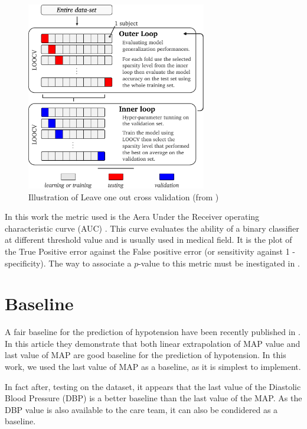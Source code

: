 \documentclass[a4paper,12pt]{article}
\begin{document}
\begin{figure}
    \centering
    \includegraphics[width=0.7\textwidth]{figures/chap_1_NLOO.pdf}
    \caption{Illustration of Leave one out cross validation (from \cite{meghnoudjSparseOptimalControlbased2024})}
    \label{fig:loocv}
\end{figure}

In this work the metric used is the Aera Under the Receiver operating characteristic curve (AUC) \cite{masonAreasRelativeOperating2002a}. This curve evaluates the ability of a binary classifier at different threshold value and is usually used in medical field. It is the plot of the True Positive error against the False positive error (or sensitivity against 1 - specificity). The way to associate a $p$-value to this metric must be inestigated in \cite{masonAreasRelativeOperating2002a}.

\section{Baseline}

A fair baseline for the prediction of hypotension have been recently published in \cite{jacquet-lagrezePredictionIntraoperativeHypotension2022}. In this article they demonstrate that both linear extrapolation of MAP value and last value of MAP are good baseline for the prediction of hypotension. In this work, we used the last value of MAP as a baseline, as it is simplest to implement. \medskip

In fact after, testing on the dataset, it appears that the last value of the Diastolic Blood Pressure (DBP) is a better baseline than the last value of the MAP. As the DBP value is also available to the care team, it can also be condidered as a baseline. \medskip
\end{document}
